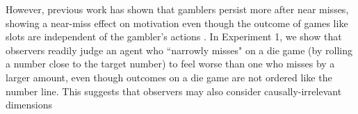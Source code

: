 \documentclass[10pt,letterpaper]{article}
\newcommand{\red}[1]{\textcolor{Red}{#1}}
\begin{document}
	 However, previous work has shown that gamblers persist more after near misses, showing a near-miss effect on motivation even though the outcome of games like slots are independent of the gambler's actions \cite{Kassinove2001, Reid1986}. In Experiment 1, we show that observers readily judge an agent who ``narrowly misses" on a die game (by rolling a number close to the target number) to feel worse than one who misses by a larger amount, even though outcomes on a die game are not ordered like the number line. This suggests that observers may also consider causally-irrelevant dimensions %

	
	


%
\end{document}
